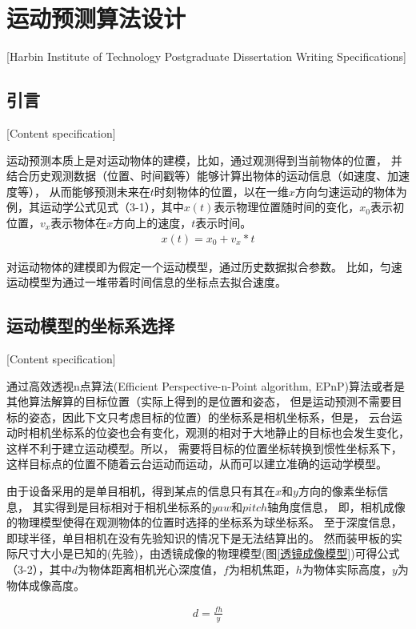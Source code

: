 


\chapter[运动预测算法设计]{运动预测算法设计}[Harbin Institute of Technology Postgraduate Dissertation Writing Specifications]


\section{引言}[Content specification]

运动预测本质上是对运动物体的建模，比如，通过观测得到当前物体的位置，
并结合历史观测数据（位置、时间戳等）能够计算出物体的运动信息（如速度、加速度等），
从而能够预测未来在$t$时刻物体的位置，以在一维$x$方向匀速运动的物体为例，其运动学公式见式（3-1），其中$x(t)$表示物理位置随时间的变化，$x_0$表示初位置，$v_x$表示物体在$x$方向上的速度，$t$表示时间。
\begin{gather}
    x(t) = x_0 + v_x*t \label{linear_model}
\end{gather}

对运动物体的建模即为假定一个运动模型，通过历史数据拟合参数。
比如，匀速运动模型为通过一堆带着时间信息的坐标点去拟合速度。




\section{运动模型的坐标系选择}[Content specification]

通过高效透视n点算法(Efficient Perspective-n-Point algorithm, EPnP)算法或者是其他算法解算的目标位置（实际上得到的是位置和姿态，
但是运动预测不需要目标的姿态，因此下文只考虑目标的位置）的坐标系是相机坐标系，但是，
云台运动时相机坐标系的位姿也会有变化，观测的相对于大地静止的目标也会发生变化，这样不利于建立运动模型。所以，
需要将目标的位置坐标转换到惯性坐标系下，这样目标点的位置不随着云台运动而运动，从而可以建立准确的运动学模型。\par
由于设备采用的是单目相机，得到某点的信息只有其在$x$和$y$方向的像素坐标信息，
其实得到是目标相对于相机坐标系的$yaw$和$pitch$轴角度信息，
即，相机成像的物理模型使得在观测物体的位置时选择的坐标系为球坐标系。
至于深度信息，即球半径，单目相机在没有先验知识的情况下是无法结算出的。
然而装甲板的实际尺寸大小是已知的(先验)，由透镜成像的物理模型(图\ref{透镜成像模型})可得公式（3-2），其中$d$为物体距离相机光心深度值，$f$为相机焦距，$h$为物体实际高度，$y$为物体成像高度。\par
\begin{gather}
    d = \frac{fh}{y} 
\end{gather}

